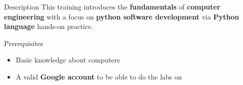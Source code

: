 \begin{frame}{Description}
  This training introduces the \textbf{fundamentals} of \textbf{computer engineering} with a focus on \textbf{python software development} via \textbf{Python language} hands-on practice.
\end{frame}

\begin{frame}{Prerequisites}
  \begin{itemize}
  \item Basic knowledge about computers
  \item A valid \textbf{Google account} to be able to do the labs on 
  \end{itemize}
\end{frame}
